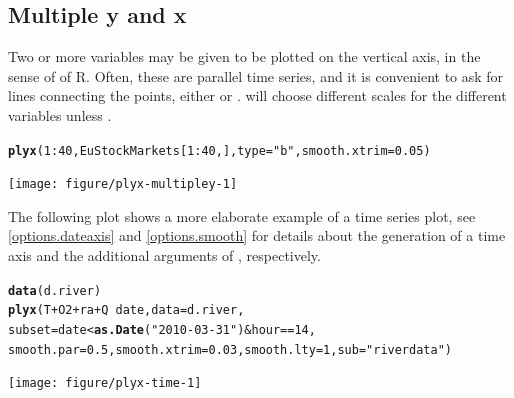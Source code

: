 \documentclass[11pt]{article}\usepackage[]{graphicx}\usepackage[]{color}
\makeatletter
\newcommand{\hlnum}[1]{\textcolor[rgb]{0.686,0.059,0.569}{#1}}%
\newcommand{\hlstr}[1]{\textcolor[rgb]{0.192,0.494,0.8}{#1}}%
\newcommand{\hlopt}[1]{\textcolor[rgb]{0,0,0}{#1}}%
\newcommand{\hlstd}[1]{\textcolor[rgb]{0.345,0.345,0.345}{#1}}%
\newcommand{\hlkwc}[1]{\textcolor[rgb]{0.333,0.667,0.333}{#1}}%
\newcommand{\hlkwd}[1]{\textcolor[rgb]{0.737,0.353,0.396}{\textbf{#1}}}%
\newenvironment{kframe}{%
 \def\at@end@of@kframe{}%
 \ifinner\ifhmode%
  \def\at@end@of@kframe{\end{minipage}}%
  \begin{minipage}{\columnwidth}%
 \fi\fi%
 \def\FrameCommand##1{\hskip\@totalleftmargin \hskip-\fboxsep
 \colorbox{shadecolor}{##1}\hskip-\fboxsep
     \hskip-\linewidth \hskip-\@totalleftmargin \hskip\columnwidth}%
 \MakeFramed {\advance\hsize-\width
   \@totalleftmargin\z@ \linewidth\hsize
   \@setminipage}}%
 {\par\unskip\endMakeFramed%
 \at@end@of@kframe}
\newenvironment{knitrout}{}{} %
\makeatother
\begin{document}
\subsection{Multiple y and x}
Two or more variables may be given to be plotted on the vertical axis,
in the sense of  of R.
Often, these are parallel time series, and it is convenient to ask for 
lines connecting the points, either  or .
 will choose different scales for the different variables unless
.

\begin{knitrout}
\color{fgcolor}\begin{kframe}
\begin{alltt}
\hlkwd{plyx}\hlstd{(}\hlnum{1}\hlopt{:}\hlnum{40}\hlstd{, EuStockMarkets[}\hlnum{1}\hlopt{:}\hlnum{40}\hlstd{,],} \hlkwc{type}\hlstd{=}\hlstr{"b"}\hlstd{,} \hlkwc{smooth.xtrim}\hlstd{=}\hlnum{0.05}\hlstd{)}
\end{alltt}
\end{kframe}
\texttt{[image: figure/plyx-multipley-1]} 

\end{knitrout}

The following plot shows a more elaborate example of a time series plot,
see \ref{options.dateaxis} and \ref{options.smooth}
for details about the generation of a time axis and
the additional arguments of , respectively.

\begin{knitrout}
\color{fgcolor}\begin{kframe}
\begin{alltt}
  \hlkwd{data}\hlstd{(d.river)}
  \hlkwd{plyx}\hlstd{(T}\hlopt{+}\hlstd{O2}\hlopt{+}\hlstd{ra}\hlopt{+}\hlstd{Q}\hlopt{~}\hlstd{date,} \hlkwc{data}\hlstd{=d.river,}
       \hlkwc{subset}\hlstd{=date}\hlopt{<}\hlkwd{as.Date}\hlstd{(}\hlstr{"2010-03-31"}\hlstd{)}\hlopt{&}\hlstd{hour}\hlopt{==}\hlnum{14}\hlstd{,}
       \hlkwc{smooth.par}\hlstd{=}\hlnum{0.5}\hlstd{,} \hlkwc{smooth.xtrim}\hlstd{=}\hlnum{0.03}\hlstd{,} \hlkwc{smooth.lty}\hlstd{=}\hlnum{1}\hlstd{,} \hlkwc{sub}\hlstd{=}\hlstr{"river data"}\hlstd{)}
\end{alltt}
\end{kframe}
\texttt{[image: figure/plyx-time-1]} 

\end{knitrout}
\end{document}

